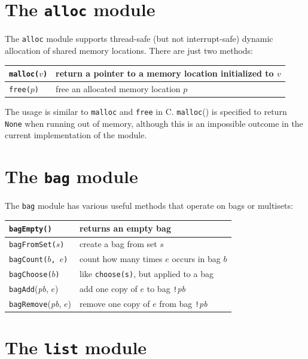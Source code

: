 \documentclass{report}
\begin{document}
\section{The \texttt{alloc} module}

The \texttt{alloc} module
%
supports thread-safe (but not interrupt-safe) dynamic allocation of
shared memory locations.  There are just two methods:

\vspace{1em}
\begin{tabular}{|l|l|}
\hline
\texttt{malloc($v$)} & return a pointer to a memory location initialized to $v$ \\
\hline
\texttt{free($p$)} & free an allocated memory location $p$ \\
\hline
\end{tabular}
\vspace{1em}

The usage is similar to \texttt{malloc} and \texttt{free} in C.
\texttt{malloc}() is specified to return \texttt{None} when running out of
memory, although this is an impossible outcome in the current
implementation of the module.

\section{The \texttt{bag} module}

The \texttt{bag} module
%
has various useful methods that operate on bags or
multisets:

\vspace{1em}
\begin{tabular}{|l|l|}
\hline
\texttt{bagEmpty()} & returns an empty bag\\
\hline
\texttt{bagFromSet($s$)} & create a bag from set $s$\\
\hline
\texttt{bagCount($b$, $e$)} & count how many times $e$ occurs in bag $b$\\
\hline
\texttt{bagChoose($b$)} & like \texttt{choose(s)}, but applied to a bag\\
\hline
\texttt{bagAdd}(\textit{pb}, $e$) & add one copy of $e$ to bag \texttt{!}\textit{pb}\\
\hline
\texttt{bagRemove}(\textit{pb}, $e$) & remove one copy of $e$ from bag \texttt{!}\textit{pb}\\
\hline
\end{tabular}

\section{The \texttt{list} module}
\label{ap:list}
\end{document}
